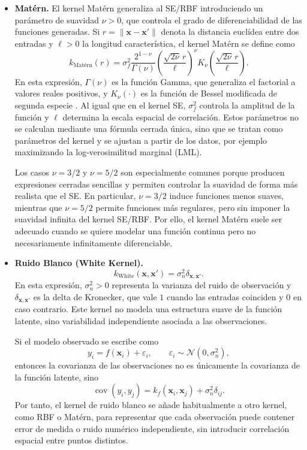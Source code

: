 \begin{itemize}
    \item \textbf{Matérn.}
    El kernel Matérn generaliza al SE/RBF introduciendo un parámetro de suavidad
    \(\nu>0\), que controla el grado de diferenciabilidad de las funciones generadas. Si
    \(r=\|\bm{x}-\bm{x}'\|\) denota la distancia euclídea entre dos entradas y \(\ell>0\) la
    longitud característica, el kernel Matérn se define como
    \begin{equation}
    k_{\text{Mat\'ern}}(r)=
    \sigma_f^2
    \frac{2^{1-\nu}}{\Gamma(\nu)}
    \left(\frac{\sqrt{2\nu}\, r}{\ell}\right)^\nu
    K_\nu\left(\frac{\sqrt{2\nu}\, r}{\ell}\right).
    \end{equation}
    En esta expresión, \(\Gamma(\nu)\) es la función Gamma, que generaliza el factorial a
    valores reales positivos, y \(K_\nu(\cdot)\) es la función de Bessel modificada de segunda
    especie \cite{dlmf_bessel}. Al igual que en el kernel SE, \(\sigma_f^2\) controla la amplitud de la función y
    \(\ell\) determina la escala espacial de correlación. Estos parámetros no se calculan mediante
    una fórmula cerrada única, sino que se tratan como parámetros del kernel y se ajustan
    a partir de los datos, por ejemplo maximizando la log-verosimilitud marginal (LML).
    
    Los casos \(\nu=3/2\) y \(\nu=5/2\) son especialmente comunes porque producen expresiones
    cerradas sencillas y permiten controlar la suavidad de forma más realista que el SE. En
    particular, \(\nu=3/2\) induce funciones menos suaves, mientras que \(\nu=5/2\) permite
    funciones más regulares, pero sin imponer la suavidad infinita del kernel SE/RBF. Por ello,
    el kernel Matérn suele ser adecuado cuando se quiere modelar una función continua pero no
    necesariamente infinitamente diferenciable.

    \item \textbf{Ruido Blanco (White Kernel).}
    \[
    k_{\mathrm{White}}(\bm{x},\bm{x}')
    =
    \sigma_n^2 \delta_{\bm{x},\bm{x}'}.
    \]
    En esta expresión, \(\sigma_n^2>0\) representa la varianza del ruido de observación y
    \(\delta_{\bm{x},\bm{x}'}\) es la delta de Kronecker, que vale \(1\) cuando las entradas
    coinciden y \(0\) en caso contrario. Este kernel no modela una estructura suave de la
    función latente, sino variabilidad independiente asociada a las observaciones.

    Si el modelo observado se escribe como
    \[
    y_i = f(\bm{x}_i)+\varepsilon_i,
    \qquad
    \varepsilon_i\sim\mathcal{N}(0,\sigma_n^2),
    \]
    entonces la covarianza de las observaciones no es únicamente la covarianza de la función
    latente, sino
    \[
    \operatorname{cov}(y_i,y_j)
    =
    k_f(\bm{x}_i,\bm{x}_j)
    +
    \sigma_n^2\delta_{ij}.
    \]
    Por tanto, el kernel de ruido blanco se añade habitualmente a otro kernel, como RBF o
    Matérn, para representar que cada observación puede contener error de medida o ruido
    numérico independiente, sin introducir correlación espacial entre puntos distintos.

\end{itemize}

